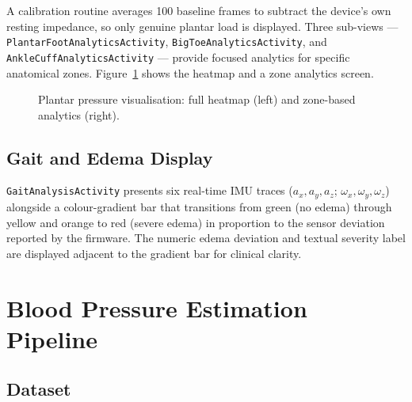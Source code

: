 \noindent A calibration routine averages 100 baseline frames to subtract the device's own resting
impedance, so only genuine plantar load is displayed.  Three sub-views — \texttt{PlantarFootAnalyticsActivity}, \texttt{BigToeAnalyticsActivity}, and \texttt{AnkleCuffAnalyticsActivity} — provide
focused analytics for specific anatomical zones.  Figure~\ref{fig:viz_heatmap} shows the heatmap
and a zone analytics screen.

\begin{figure}[htbp]
  \centering
  \hfill
  \caption{Plantar pressure visualisation: full heatmap (left) and zone-based analytics (right).}
  \label{fig:viz_heatmap}
\end{figure}

\subsection{Gait and Edema Display}
\label{subsec:viz_gait}

\texttt{GaitAnalysisActivity} presents six real-time IMU traces ($a_x, a_y, a_z$;
$\omega_x, \omega_y, \omega_z$) alongside a colour-gradient bar that transitions from green
(no edema) through yellow and orange to red (severe edema) in proportion to the sensor
deviation reported by the firmware.  The numeric edema deviation and textual severity label are
displayed adjacent to the gradient bar for clinical clarity.


\section{Blood Pressure Estimation Pipeline}
\label{sec:bpml}

\subsection{Dataset}
\label{subsubsec:bp_dataset}

